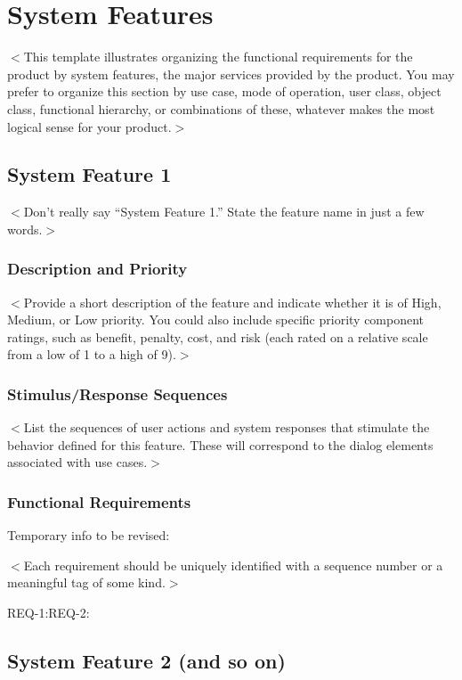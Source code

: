 \documentclass{scrreprt}
\begin{document}
\chapter{System Features}
$<$This template illustrates organizing the functional requirements for the 
product by system features, the major services provided by the product. You may 
prefer to organize this section by use case, mode of operation, user class, 
object class, functional hierarchy, or combinations of these, whatever makes the 
most logical sense for your product.$>$

\section{System Feature 1}
$<$Don’t really say “System Feature 1.” State the feature name in just a few 
words.$>$

\subsection{Description and Priority}
$<$Provide a short description of the feature and indicate whether it is of 
High, Medium, or Low priority. You could also include specific priority 
component ratings, such as benefit, penalty, cost, and risk (each rated on a 
relative scale from a low of 1 to a high of 9).$>$

\subsection{Stimulus/Response Sequences}
$<$List the sequences of user actions and system responses that stimulate the 
behavior defined for this feature. These will correspond to the dialog elements 
associated with use cases.$>$

\subsection{Functional Requirements}

Temporary info to be revised: 


$<$Each requirement should be uniquely identified with a sequence number or a 
meaningful tag of some kind.$>$

REQ-1:REQ-2:

\section{System Feature 2 (and so on)}
\end{document}
